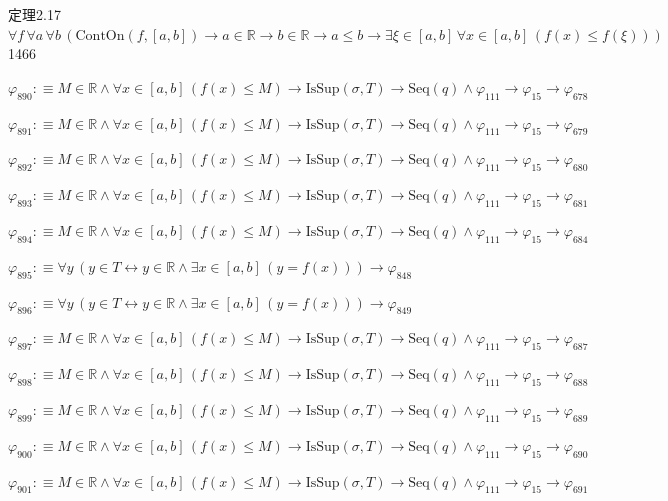 \begin{fullproof}{定理2.17}{$\forall f\,\forall a\,\forall b\,(\mathrm{ContOn}(f,[a,b]) \to a \in \mathbb{R} \to b \in \mathbb{R} \to a \leq b \to \exists \xi \in [a,b]\,\forall x \in [a,b]\,(f(x) \leq f(\xi)))$}{1466}
\begin{abbrevlist}
\item $\varphi_{890} :\equiv M \in \mathbb{R} \land \forall x \in [a,b]\,(f(x) \leq M) \to \mathrm{IsSup}(\sigma,T) \to \mathrm{Seq}(q) \land \varphi_{111} \to \varphi_{15} \to \varphi_{678}$
\item $\varphi_{891} :\equiv M \in \mathbb{R} \land \forall x \in [a,b]\,(f(x) \leq M) \to \mathrm{IsSup}(\sigma,T) \to \mathrm{Seq}(q) \land \varphi_{111} \to \varphi_{15} \to \varphi_{679}$
\item $\varphi_{892} :\equiv M \in \mathbb{R} \land \forall x \in [a,b]\,(f(x) \leq M) \to \mathrm{IsSup}(\sigma,T) \to \mathrm{Seq}(q) \land \varphi_{111} \to \varphi_{15} \to \varphi_{680}$
\item $\varphi_{893} :\equiv M \in \mathbb{R} \land \forall x \in [a,b]\,(f(x) \leq M) \to \mathrm{IsSup}(\sigma,T) \to \mathrm{Seq}(q) \land \varphi_{111} \to \varphi_{15} \to \varphi_{681}$
\item $\varphi_{894} :\equiv M \in \mathbb{R} \land \forall x \in [a,b]\,(f(x) \leq M) \to \mathrm{IsSup}(\sigma,T) \to \mathrm{Seq}(q) \land \varphi_{111} \to \varphi_{15} \to \varphi_{684}$
\item $\varphi_{895} :\equiv \forall y\,(y \in T \leftrightarrow y \in \mathbb{R} \land \exists x \in [a,b]\,(y = f(x))) \to \varphi_{848}$
\item $\varphi_{896} :\equiv \forall y\,(y \in T \leftrightarrow y \in \mathbb{R} \land \exists x \in [a,b]\,(y = f(x))) \to \varphi_{849}$
\item $\varphi_{897} :\equiv M \in \mathbb{R} \land \forall x \in [a,b]\,(f(x) \leq M) \to \mathrm{IsSup}(\sigma,T) \to \mathrm{Seq}(q) \land \varphi_{111} \to \varphi_{15} \to \varphi_{687}$
\item $\varphi_{898} :\equiv M \in \mathbb{R} \land \forall x \in [a,b]\,(f(x) \leq M) \to \mathrm{IsSup}(\sigma,T) \to \mathrm{Seq}(q) \land \varphi_{111} \to \varphi_{15} \to \varphi_{688}$
\item $\varphi_{899} :\equiv M \in \mathbb{R} \land \forall x \in [a,b]\,(f(x) \leq M) \to \mathrm{IsSup}(\sigma,T) \to \mathrm{Seq}(q) \land \varphi_{111} \to \varphi_{15} \to \varphi_{689}$
\item $\varphi_{900} :\equiv M \in \mathbb{R} \land \forall x \in [a,b]\,(f(x) \leq M) \to \mathrm{IsSup}(\sigma,T) \to \mathrm{Seq}(q) \land \varphi_{111} \to \varphi_{15} \to \varphi_{690}$
\item $\varphi_{901} :\equiv M \in \mathbb{R} \land \forall x \in [a,b]\,(f(x) \leq M) \to \mathrm{IsSup}(\sigma,T) \to \mathrm{Seq}(q) \land \varphi_{111} \to \varphi_{15} \to \varphi_{691}$

\end{abbrevlist}
\end{fullproof}
